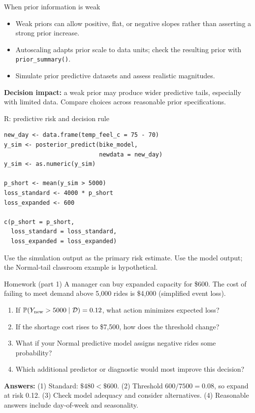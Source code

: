 \documentclass[aspectratio=43,11pt]{beamer}
\newcommand{\Prob}{\mathbb{P}}
\newcommand{\dd}{\mathcal D}
\begin{document}
\begin{frame}{When prior information is weak}
\begin{itemize}
\item Weak priors can allow positive, flat, or negative slopes rather than asserting a strong prior increase.
\item Autoscaling adapts prior scale to data units; check the resulting prior with \texttt{prior\_summary()}.
\item Simulate prior predictive datasets and assess realistic magnitudes.
\end{itemize}
\par\medskip
\textbf{Decision impact:} a weak prior may produce wider predictive tails, especially with limited data. Compare choices across reasonable prior specifications.
\end{frame}

\begin{frame}[fragile]{R: predictive risk and decision rule}
\footnotesize
\begin{verbatim}
new_day <- data.frame(temp_feel_c = 75 - 70)
y_sim <- posterior_predict(bike_model,
                           newdata = new_day)
y_sim <- as.numeric(y_sim)

p_short <- mean(y_sim > 5000)
loss_standard <- 4000 * p_short
loss_expanded <- 600

c(p_short = p_short,
  loss_standard = loss_standard,
  loss_expanded = loss_expanded)
\end{verbatim}
\scriptsize Use the simulation output as the primary risk estimate. Use the model output; the Normal-tail classroom example is hypothetical.
\end{frame}

\begin{frame}{Homework (part 1)}
A manager can buy expanded capacity for \$600. The cost of failing to meet demand above 5,000 rides is \$4,000 (simplified event loss).
\begin{enumerate}
\item If $\Prob(Y_{\rm new}>5000\mid\dd)=0.12$, what action minimizes expected loss?
\item If the shortage cost rises to \$7,500, how does the threshold change?
\item What if your Normal predictive model assigns negative rides some probability?
\item Which additional predictor or diagnostic would most improve this decision?
\end{enumerate}
\par\medskip
\scriptsize \textbf{Answers:} (1) Standard: $\$480<\$600$. (2) Threshold $600/7500=0.08$, so expand at risk 0.12. (3) Check model adequacy and consider alternatives. (4) Reasonable answers include day-of-week and seasonality.
\end{frame}
\end{document}
